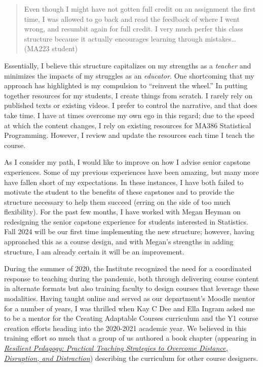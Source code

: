 \documentclass[
  letterpaper,
  DIV=11,
  numbers=noendperiod]{scrreprt}
\begin{document}
\begin{quote}
Even though I might have not gotten full credit on an assignment the
first time, I was allowed to go back and read the feedback of where I
went wrong, and resumbit again for full credit. I very much perfer this
class structure because it actually encourages learning through
mistakes\ldots{} (MA223 student)
\end{quote}

Essentially, I believe this structure capitalizes on my strengths as a
\emph{teacher} and minimizes the impacts of my struggles as an
\emph{educator}. One shortcoming that my approach has highlighted is my
compulsion to ``reinvent the wheel.'' In putting together resources for
my students, I create things from scratch. I rarely rely on published
texts or existing videos. I prefer to control the narrative, and that
does take time. I have at times overcome my own ego in this regard; due
to the speed at which the content changes, I rely on existing resources
for MA386 Statistical Programming. However, I review and update the
resources each time I teach the course.

As I consider my path, I would like to improve on how I advise senior
capstone experiences. Some of my previous experiences have been amazing,
but many more have fallen short of my expectations. In these instances,
I have both failed to motivate the student to the benefits of these
capstones and to provide the structure necessary to help them succeed
(erring on the side of too much flexibility). For the past few months, I
have worked with Megan Heyman on redesigning the senior capstone
experience for students interested in Statistics. Fall 2024 will be our
first time implementing the new structure; however, having approached
this as a course design, and with Megan's strengths in adding structure,
I am already certain it will be an improvement.

During the summer of 2020, the Institute recognized the need for a
coordinated response to teaching during the pandemic, both through
delivering course content in alternate formats but also training faculty
to design courses that leverage these modalities. Having taught online
and served as our department's Moodle mentor for a number of years, I
was thrilled when Kay C Dee and Ella Ingram asked me to be a mentor for
the Creating Adaptable Courses curriculum and the Y1 course creation
efforts heading into the 2020-2021 academic year. We believed in this
training effort so much that a group of us authored a book chapter
(appearing in
\href{https://uen.pressbooks.pub/resilientpedagogy/}{\emph{Resilient
Pedagogy: Practical Teaching Strategies to Overcome Distance,
Disruption, and Distraction}}) describing the curriculum for other
course designers.
\end{document}
